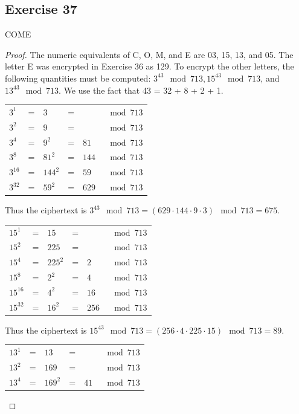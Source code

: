 \documentclass[14pt]{extarticle}
\begin{document}
\subsection{Exercise 37}
COME
\begin{proof}
        The numeric equivalents of C, O, M, and E are 03, 15, 13, and 05. The letter E was encrypted in Exercise 36 as 129.
        To encrypt the other letters, the following quantities must be computed: \(3^{43} \mod 713, 15^{43} \mod 713\), and
        \(13^{43} \mod 713\). We use the fact that 43 = 32 + 8 + 2 + 1.

        \begin{tabular}{lclcll}
                \(3^1\)    & = & \(3\)     & = & \(\)    & \(\mod 713\) \\
                \(3^2\)    & = & \(9\)     & = & \(\)    & \(\mod 713\) \\
                \(3^4\)    & = & \(9^2\)   & = & \(81\)  & \(\mod 713\) \\
                \(3^8\)    & = & \(81^2\)  & = & \(144\) & \(\mod 713\) \\
                \(3^{16}\) & = & \(144^2\) & = & \(59\)  & \(\mod 713\) \\
                \(3^{32}\) & = & \(59^2\)  & = & \(629\) & \(\mod 713\)
        \end{tabular}

        Thus the ciphertext is \(3^{43} \mod 713 = (629 \cdot 144 \cdot 9 \cdot 3) \mod 713 = 675\).

        \begin{tabular}{lclcll}
                \(15^1\)    & = & \(15\)    & = & \(\)    & \(\mod 713\) \\
                \(15^2\)    & = & \(225\)   & = & \(\)    & \(\mod 713\) \\
                \(15^4\)    & = & \(225^2\) & = & \(2\)   & \(\mod 713\) \\
                \(15^8\)    & = & \(2^2\)   & = & \(4\)   & \(\mod 713\) \\
                \(15^{16}\) & = & \(4^2\)   & = & \(16\)  & \(\mod 713\) \\
                \(15^{32}\) & = & \(16^2\)  & = & \(256\) & \(\mod 713\)
        \end{tabular}

        Thus the ciphertext is \(15^{43} \mod 713 = (256 \cdot 4 \cdot 225 \cdot 15) \mod 713 = 89\).

        \begin{tabular}{lclcll}
                \(13^1\) & = & \(13\)    & = & \(\)   & \(\mod 713\) \\
                \(13^2\) & = & \(169\)   & = & \(\)   & \(\mod 713\) \\
                \(13^4\) & = & \(169^2\) & = & \(41\) & \(\mod 713\) \\
        \end{tabular}


\end{proof}
\end{document}
